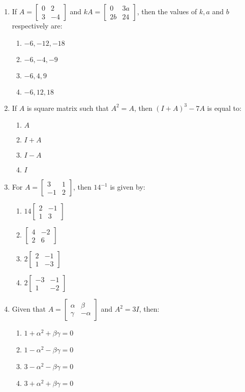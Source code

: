 \documentclass{article}
\newcommand{\myvec}[1]{\begin{bmatrix}#1\end{bmatrix}}
\begin{document}
\begin{enumerate}
    \item If $A =\myvec{0&2\\3&-4}$ and $kA =\myvec{0&3a\\2b&24}$, then the values of $k ,a$ and $b$ respectively are:
    \begin{enumerate}
        \item $-6, -12, -18$
        \item $-6, -4, -9$
        \item $-6, 4, 9$
        \item $-6, 12, 18$
    \end{enumerate}
    
    \item If $A$ is square matrix such that $A^2 = A$, then $(I + A)^3 - 7A$ is equal to:
    \begin{enumerate}
        \item $A$
        \item $I + A$
        \item $I - A$
        \item $I$ 
    \end{enumerate}
    
    \item For $A =
        \myvec{3&1\\-1& 2}$, then $14^{-1}$ is given by:
    \begin{enumerate}
        \item $14 \myvec{2 &-1\\1 &3}$
        \item $\myvec{4 &-2\\2&6}$
        \item $2\myvec{2&-1\\1&-3}$
        \item $2\myvec{-3&-1\\1&-2}$
    \end{enumerate}
    
    \item Given that $A = 
        \myvec{\alpha & \beta \\ \gamma & -\alpha}$ and $A^2 = 3I$, then:
    \begin{enumerate}
        \item $1 + \alpha^2 + \beta\gamma = 0$
        \item $1 - \alpha^2 - \beta\gamma = 0$
        \item $3 - \alpha^2 - \beta\gamma = 0$
        \item $3 + \alpha^2 + \beta\gamma = 0$
    \end{enumerate}
    

\end{enumerate}
\end{document}
